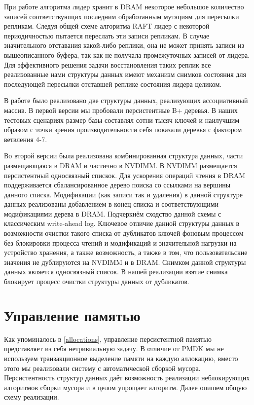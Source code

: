 \documentclass[pdftex,ptm,12pt,a4paper]{report}
\theoremstyle{definition}
\begin{document}
При работе алгоритма лидер хранит в DRAM некоторое небольшое количество записей соответствующих последним обработанным мутациям для пересылки репликам.
Следуя общей схеме алгоритма RAFT лидер с некоторой периодичностью пытается переслать эти записи репликам. В случае значительного отставания какой-либо реплики, она не может
принять записи из вышеописанного буфера, так как не получала промежуточных записей от лидера. Для эффективного решения задачи восстановления таких реплик все реализованные нами
структуры данных имеют механизм снимков состояния для последующей пересылки отставшей реплике состояния лидера целиком.

В работе было реализовано две структуры данных, реализующих ассоциативный массив. В первой версии мы пробовали персистентные B+ деревья.
В наших тестовых сценариях размер базы составлял сотни тысяч ключей и наилучшим образом с точки зрения производительности себя показали деревья с фактором ветвления 4-7.

Во второй версии была реализована комбинированная структура данных, части размещающаяся в DRAM и частично в NVDIMM. В NVDIMM размещается персистентный односвязный спискок.
Для ускорения операций чтения в DRAM поддерживается сбалансированное дерево поиска со ссылками на вершины данного списка.
Модификации (как записи так и удаления) в данной структуре данных реализованы добавлением в конец списка и соответствующими модификациями дерева в DRAM.
Подчеркнём сходство данной схемы с классическим write-ahead log. Ключевое отличие данной структуры данных в возможности очистки такого списка от дубликатов ключей фоновым
процессом без блокировки процесса чтений и модификаций и значительной нагрузки на устройство хранения, а также возможность, а также в том, что пользовательские значения не дублируются
на NVDIMM и в DRAM.
Снимком данной структуры данных является односвязный список.
В нашей реализации взятие снимка блокирует процесс очистки структуры данных от дубликатов.

\section{Управление памятью}
\label{gc}
Как упоминалось в \ref{allocations}, управление персистентной памятью представляет из себя нетривиальную задачу.
В отличие от PMDK мы не используем транзакционное выделение памяти на каждую аллокацию, вместо этого мы реализовали систему с автоматической сборкой мусора.
Персистентность структур данных даёт возможность реализации неблокирующих алгоритмов сборки мусора и в целом упрощает алгоритм.
Далее опишем общую схему реализации. 
\end{document}
